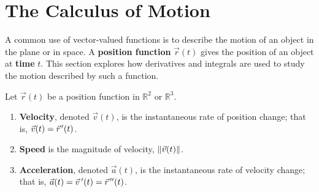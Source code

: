 \section{The Calculus of Motion}\label{sec:vvf_motion}

A common use of vector-valued functions is to describe the motion of an object in the plane or in space. A \textbf{position function} $\vec r(t)$ gives the position of an object at \textbf{time} $t$. This section explores how derivatives and integrals are used to study the motion described by such a function.

\begin{definition}\label{def:vvf_motion}%
Let $\vec r(t)$ be a position function in $\mathbb{R}^2$ or $\mathbb{R}^3$.
\begin{enumerate}\raggedright
	\item \textbf{Velocity}, denoted $\vec v(t)$, is the instantaneous rate of position change; that is, $\vec v(t) = \vec r\hskip1.25pt '(t)$.
	\item	\textbf{Speed} is the magnitude of velocity, $\left\lVert \vec v(t) \right\rVert$.
	\item	\textbf{Acceleration}, denoted $\vec a(t)$, is the instantaneous rate of velocity change; that is, $\vec a(t) = \vec v\,'(t) = \vec r\hskip1.25pt ''(t)$.
\end{enumerate}
\end{definition}


